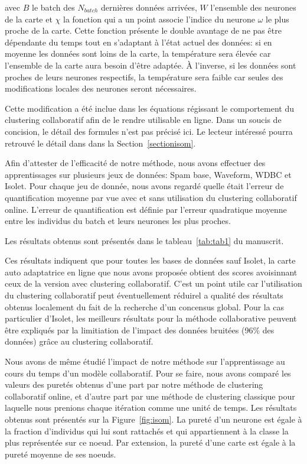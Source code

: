     avec $B$ le batch des $N_{batch}$ dernières données arrivées, $W$ l'ensemble des neurones de la carte et $\chi$ la fonction qui a un point associe l'indice du neurone $\omega$ le plus proche de la carte.
    Cette fonction présente le double avantage de ne pas \^{e}tre dépendante du temps tout en s'adaptant à l'état actuel des données: si en moyenne les données sont loins de la carte, la température sera élevée car l'ensemble de la carte aura besoin d'\^{e}tre adaptée. À l'inverse, si les données sont proches de leurs neurones respectifs, la température sera faible car seules des modifications locales des neurones seront nécessaires.

    Cette modification a été inclue dans les équations régissant le comportement du clustering collaboratif afin de le rendre utilisable en ligne. Dans un soucis de concision, le détail des formules n'est pas précisé ici. Le lecteur intéressé pourra retrouvé le détail dans dans la Section~\ref{sectionisom}.

    Afin d'attester de l'efficacité de notre méthode, nous avons effectuer des apprentissages sur plusieurs jeux de données: Spam base, Waveform, WDBC et Isolet. Pour chaque jeu de donnée, nous avons regardé quelle était l'erreur de quantification moyenne par vue avec et sans utilisation du clustering collaboratif online. L'erreur de quantification est définie par l'erreur quadratique moyenne entre les individus du batch et leurs neurones les plus proches.

    Les résultats obtenus sont présentés dans le tableau~\ref{tab:tab1} du manuscrit.

    Ces résultats indiquent que pour toutes les bases de données sauf Isolet, la carte auto adaptatrice en ligne que nous avons proposée obtient des scores avoisinnant ceux de la version avec clustering collaboratif. C'est un point utile car l'utilisation du clustering collaboratif peut éventuellement réduirel a qualité des résultats obtenus localement du fait de la recherche d'un concensus global. Pour la cas particulier d'Isolet, les meilleurs résultats pour la méthode collaborative peuvent \^{e}tre expliqués par la limitiation de l'impact des données bruitées (96\% des données) grâce au clustering collaboratif.

    Nous avons de m\^{e}me étudié l'impact de notre méthode sur l'apprentissage au cours du temps d'un modèle collaboratif. Pour se faire, nous avons comparé les valeurs des puretés obtenus d'une part par notre méthode de clustering collaboratif online, et d'autre part par une méthode de clustering classique pour laquelle nous prenions chaque itération comme une unité de temps. Les résultats obtenus sont présentés sur la Figure~\ref{fig:isom}. La pureté d'un neurone est égale à la fraction d'individus qui lui sont rattachés et qui appartiennent à la classe la plus représentée sur ce noeud. Par extension, la pureté d'une carte est égale à la pureté moyenne de ses noeuds.

